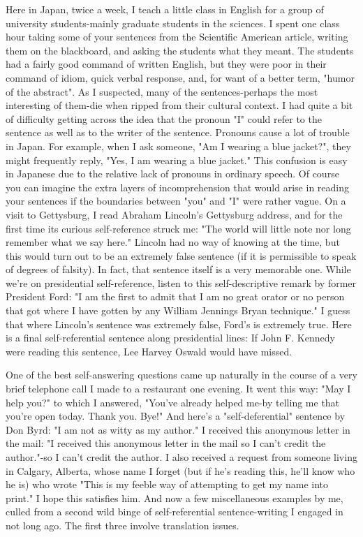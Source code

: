 Here in Japan, twice a week, I teach a little class in English for a group of university students-mainly graduate students in the sciences. I spent one class hour taking some of your sentences from the Scientific American article, writing them on the blackboard, and asking the students what they meant. The students had a fairly good command of written English, but they were poor in their command of idiom, quick verbal response, and, for want of a better term, "humor of the abstract". As I suspected, many of the sentences-perhaps the most interesting of them-die when ripped from their cultural context. I had quite a bit of difficulty getting across the idea that the pronoun "I" could refer to the sentence as well as to the writer of the sentence. Pronouns cause a lot of trouble in Japan. For example, when I ask someone, "Am I wearing a blue jacket?", they might frequently reply, "Yes, I am wearing a blue jacket." This confusion is easy in Japanese due to the relative lack of pronouns in ordinary speech. Of course you can imagine the extra layers of incomprehension that would arise in reading your sentences if the boundaries between "you" and "I" were rather vague. 
On a visit to Gettysburg, I read Abraham Lincoln's Gettysburg address, and for the first time its curious self-reference struck me: "The world will little note nor long remember what we say here." Lincoln had no way of knowing at the time, but this would turn out to be an extremely false sentence (if it is permissible to speak of degrees of falsity). In fact, that sentence itself is a very memorable one. While we're on presidential self-reference, listen to this self-descriptive remark by former President Ford: "I am the first to admit that I am no great orator or no person that got where I have gotten by any William Jennings Bryan technique." I guess that where Lincoln's sentence was extremely false, Ford's is extremely true. Here is a final self-referential sentence along presidential lines: 
If John F. Kennedy were reading this sentence, Lee Harvey Oswald would have missed. 
\separator

One of the best self-answering questions came up naturally in the course of a very brief telephone call I made to a restaurant one evening. It went this way: "May I help you?" to which I answered, "You've already helped me-by telling me that you're open today. Thank you. Bye!" And here's a "self-deferential" sentence by Don Byrd: "I am not as witty as my author." I received this anonymous letter in the mail: "I received this anonymous letter in the mail so I can't credit the author."-so I can't credit the author. I also received a request from someone living in Calgary, Alberta, whose name I forget (but if he's reading this, he'll know who he is) who wrote "This is my feeble way of attempting to get my name into print." I hope this satisfies him. And now a few miscellaneous examples by me, culled from a second wild binge of self-referential sentence-writing I engaged in not long ago. The first three involve translation issues. 



